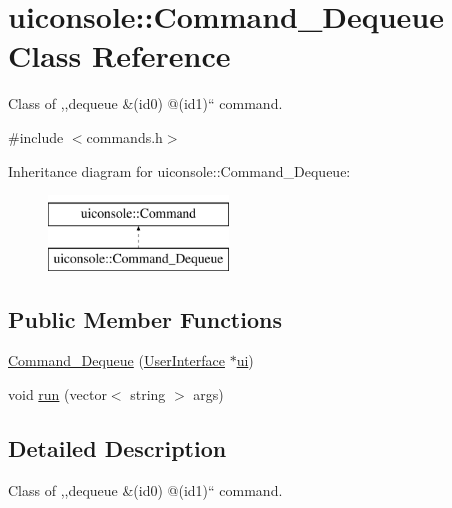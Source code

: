 \hypertarget{classuiconsole_1_1Command__Dequeue}{
\section{uiconsole::Command\_\-Dequeue Class Reference}
\label{d2/de6/classuiconsole_1_1Command__Dequeue}
}


Class of ,,dequeue \&(id0) @(id1)`` command.  




{\ttfamily \#include $<$commands.h$>$}

Inheritance diagram for uiconsole::Command\_\-Dequeue:\begin{figure}[H]
\begin{center}
\leavevmode
\includegraphics[height=2.000000cm]{d2/de6/classuiconsole_1_1Command__Dequeue}
\end{center}
\end{figure}
\subsection*{Public Member Functions}
\begin{DoxyCompactItemize}
\item 
\hyperlink{classuiconsole_1_1Command__Dequeue_a9ba380c71a66a628ba2f68f9b5636c97}{Command\_\-Dequeue} (\hyperlink{classUserInterface}{UserInterface} $\ast$\hyperlink{classuiconsole_1_1Command_ab43ed5152860c099f858d62f9f556699}{ui})
\item 
void \hyperlink{classuiconsole_1_1Command__Dequeue_a4ffbe293d61a29f4bc36428578dad66e}{run} (vector$<$ string $>$ args)
\end{DoxyCompactItemize}


\subsection{Detailed Description}
Class of ,,dequeue \&(id0) @(id1)`` command. 

